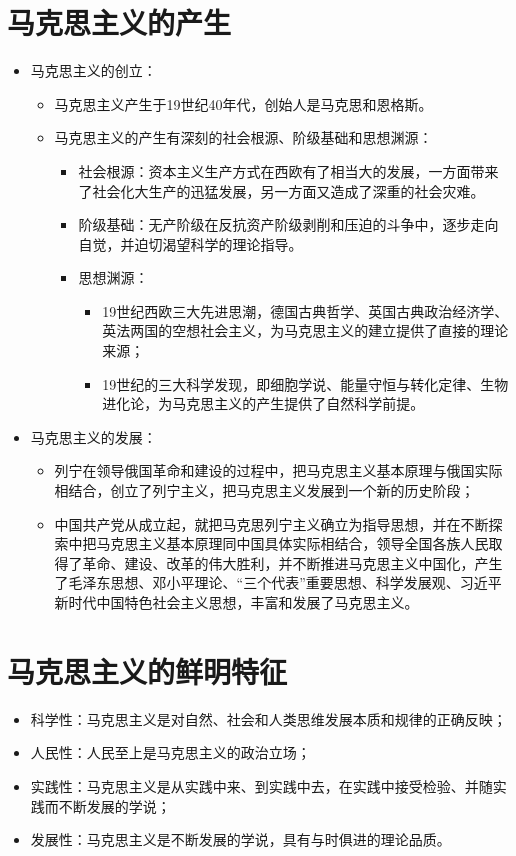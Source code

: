 \documentclass[12pt,openany]{ctexbook}
\begin{document}
\section{马克思主义的产生}
\begin{itemize}
  \item 马克思主义的创立：
\begin{itemize}
  \item 马克思主义产生于19世纪40年代，创始人是马克思和恩格斯。
  \item 马克思主义的产生有深刻的社会根源、阶级基础和思想渊源：
\begin{itemize}
  \item 社会根源：资本主义生产方式在西欧有了相当大的发展，一方面带来了社会化大生产的迅猛发展，另一方面又造成了深重的社会灾难。
  \item 阶级基础：无产阶级在反抗资产阶级剥削和压迫的斗争中，逐步走向自觉，并迫切渴望科学的理论指导。
  \item 思想渊源：
\begin{itemize}
  \item 19世纪西欧三大先进思潮，德国古典哲学、英国古典政治经济学、英法两国的空想社会主义，为马克思主义的建立提供了直接的理论来源； 
  \item 19世纪的三大科学发现，即细胞学说、能量守恒与转化定律、生物进化论，为马克思主义的产生提供了自然科学前提。
\end{itemize}
\end{itemize}
\end{itemize}
  \item 马克思主义的发展：
\begin{itemize}
  \item 列宁在领导俄国革命和建设的过程中，把马克思主义基本原理与俄国实际相结合，创立了列宁主义，把马克思主义发展到一个新的历史阶段；
  \item 中国共产党从成立起，就把马克思列宁主义确立为指导思想，并在不断探索中把马克思主义基本原理同中国具体实际相结合，领导全国各族人民取得了革命、建设、改革的伟大胜利，并不断推进马克思主义中国化，产生了毛泽东思想、邓小平理论、“三个代表”重要思想、科学发展观、习近平新时代中国特色社会主义思想，丰富和发展了马克思主义。
\end{itemize}
\end{itemize}
\section{马克思主义的鲜明特征}
\begin{itemize}
  \item 科学性：马克思主义是对自然、社会和人类思维发展本质和规律的正确反映；
  \item 人民性：人民至上是马克思主义的政治立场；
  \item 实践性：马克思主义是从实践中来、到实践中去，在实践中接受检验、并随实践而不断发展的学说；
  \item 发展性：马克思主义是不断发展的学说，具有与时俱进的理论品质。
\end{itemize}
\end{document}
